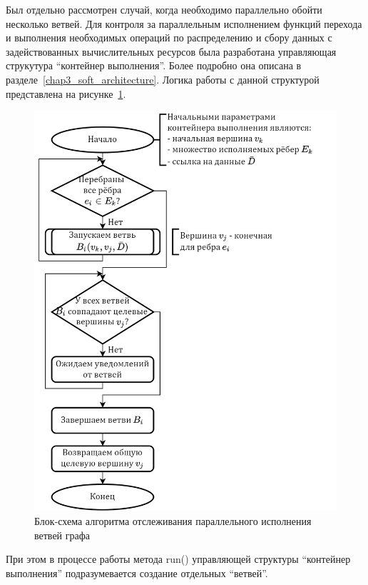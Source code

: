 Был отдельно рассмотрен случай, когда необходимо параллельно обойти несколько ветвей. Для контроля за параллельным исполнением функций перехода и выполнения необходимых операций по распределению и сбору данных с задействованных вычислительных ресурсов была разработана управляющая струкутура ``контейнер выполнения''. Более подробно она описана в разделе~\ref{chap3_soft_architecture}. Логика работы с данной структурой представлена на рисунке~\ref{fig:flowchartExecutionContainer}.
\begin{figure}[!ht]
    \centering
    \includegraphics[height=0.45\textheight]{figures/flowchart.executionContainer.png}
    \caption{Блок-схема алгоритма отслеживания параллельного исполнения ветвей графа}
    \label{fig:flowchartExecutionContainer}
\end{figure}

При этом в процессе работы метода \textsf{run()} управляющей структуры ``контейнер выполнения'' подразумевается создание отдельных ``ветвей''.

